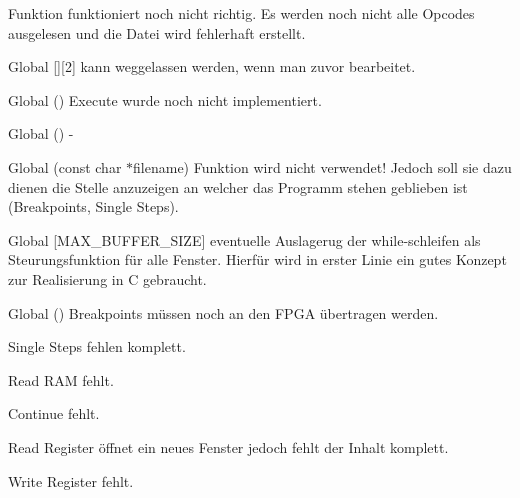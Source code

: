 \begin{DoxyRefList}
Funktion funktioniert noch nicht richtig. Es werden noch nicht alle Opcodes ausgelesen und die Datei wird fehlerhaft erstellt. 
\item[Global \doxylink{Compiler_8h_a251a4c04b6f21dcb3976cb968898e65d}{binary\+Mappings} \mbox{[}\mbox{]}\mbox{[}2\mbox{]}]\label{todo__todo000001}%
%
kann weggelassen werden, wenn man  zuvor bearbeitet.  
\item[Global \doxylink{bootloader_8c_a8a25febfe7fa1335d3fa12a052d4c7c4}{bootloader} ()]\label{todo__todo000006}%
%
Execute wurde noch nicht implementiert.  
\item[Global \doxylink{configserial_8c_a0bea76931a7bc8758570dc3144bf8210}{configserial} ()]\label{todo__todo000009}%
%
-\/  
\item[Global \doxylink{debugger_8c_ae16e3293f006339f3d6e659bed97f8e2}{count\+Lines} (const char \texorpdfstring{$\ast$}{*}filename)]\label{todo__todo000016}%
%
Funktion wird nicht verwendet! Jedoch soll sie dazu dienen die Stelle anzuzeigen an welcher das Programm stehen geblieben ist (Breakpoints, Single Steps). 
\item[Global \doxylink{main_2src_2main_8c_ad9e267f2d30791507c2925e612a99375}{current\+\_\+file} \mbox{[}MAX\+\_\+\+BUFFER\+\_\+\+SIZE\mbox{]}]\label{todo__todo000019}%
%
eventuelle Auslagerug der while-\/schleifen als Steurungsfunktion für alle Fenster. Hierfür wird in erster Linie ein gutes Konzept zur Realisierung in C gebraucht.  
\item[Global \doxylink{debugger_8c_a19c86e0d31779f284e91d4d016448264}{debugger} ()]\label{todo__todo000010}%
%
Breakpoints müssen noch an den FPGA übertragen werden. 



Single Steps fehlen komplett. 



Read RAM fehlt. 



Continue fehlt. 



Read Register öffnet ein neues Fenster jedoch fehlt der Inhalt komplett. 



Write Register fehlt. 




\end{DoxyRefList}
